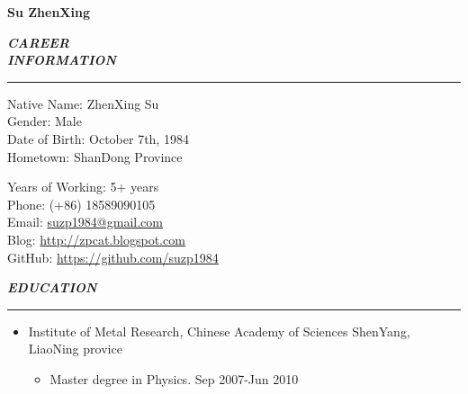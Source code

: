 \documentclass[a4paper, 10pt, titlepage]{article}
\newcommand{\wuhao}{\fontsize{10.5pt}{10.5pt}\selectfont}   %
\begin{document}
\renewcommand{\normalsize}{\wuhao}         %

\setlength{\parindent}{0em}                    
\newcommand{\mysection}[1]{\vspace{5pt} {\bfseries \textsl{#1}} \\ {\color{gray} \rule[5pt]{\textwidth}{0.3pt}}}
\renewcommand{\labelitemi}{$\bullet$}

\newcommand{\cvtitle}[1]{\centerline{\huge \textbf{#1}} \bigskip}
\newcommand{\career}[2]{\vspace{5pt} {{\bfseries \textsl{#1}} \hspace{5pt} {\normalsize{#2}}} \\}
\pagestyle{empty}

\cvtitle{Su ZhenXing}
\career{CAREER}{Linux Software Engineer}

\mysection{INFORMATION}
\begin{minipage}[t]{0.495\textwidth}
  Native Name: ZhenXing Su \\
  Gender: Male \\
  Date of Birth: October 7th, 1984\\
  Hometown: ShanDong Province
\end{minipage}
\begin{minipage}[t]{0.495\textwidth}
  Years of Working: 5+ years\\
  Phone: (+86) 18589090105 \\
  Email: \href{mailto:suzp1984@gmail.com}{suzp1984@gmail.com} \\
  Blog: \href{http://zpcat.blogspot.com}{http://zpcat.blogspot.com} \\
  GitHub: \href{https://github.com/suzp1984}{https://github.com/suzp1984}
\end{minipage}

\vspace{3mm}
\mysection{EDUCATION}

\begin{itemize}

\item Institute of Metal Research, Chinese Academy of Sciences \hfill \textrm{ShenYang, LiaoNing provice}
  \begin{itemize}
    \item Master degree in Physics. \hfill \textrm{Sep 2007-Jun 2010}
  \end{itemize}
\end{itemize}
\end{document}
